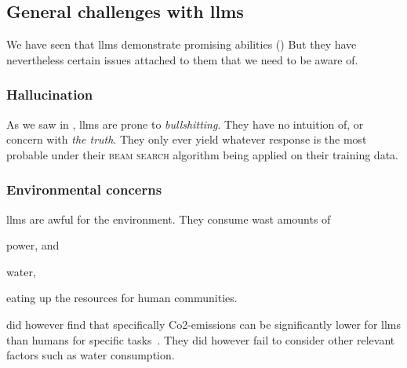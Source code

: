 \subsection{General challenges with \acrshort{llms}}\label{sec:llmProblems}

We have seen that \acrshort{llms} demonstrate promising abilities () But they have nevertheless certain issues attached to them that we need to be aware of.

\subsubsection{Hallucination}\label{sec:llmHallucination}

As we saw in , \acrshort{llms} are prone to
\textit{bullshitting}. They have no intuition of, or concern with \textit{the
    truth}. They only ever yield whatever response is the most probable under their
\textsc{beam search} algorithm being applied on their training data.

\subsubsection{Environmental concerns}

\acrshort{llms} are awful for the environment. They consume wast amounts of \begin{inparaenum}
    \item power,
    and
    \item water,
\end{inparaenum}
eating up the resources for human communities.

\citeauthor{llmCarbon} did however find that specifically Co2-emissions can be
significantly lower for \acrshort{llms} than humans for specific
tasks~\cite{llmCarbon}. They did however fail to consider other relevant factors such
as water consumption.




